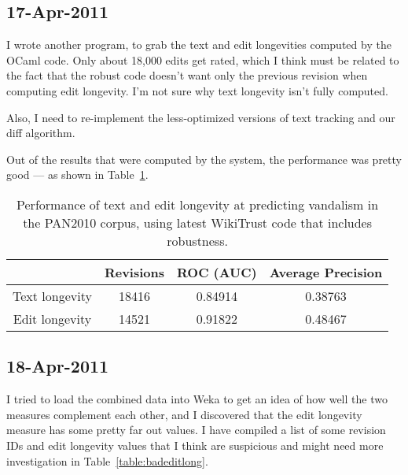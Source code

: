 \subsection{17-Apr-2011}

I wrote another program, 
to grab the text and edit longevities computed by the OCaml code.
Only about 18,000 edits get rated, which I think must be related
to the fact that the robust code doesn't want only the previous
revision when computing edit longevity.
I'm not sure why text longevity isn't fully computed.

Also, I need to re-implement the less-optimized versions
of text tracking and our diff algorithm.

Out of the results that were computed by the system,
the performance was pretty good --- as shown in
Table~\ref{table:robustlongevities}.

\begin{table}[htbp]
\begin{center}
    \begin{tabular}{|c|c|c|c|}
    \hline
    & Revisions & ROC (AUC) & Average Precision \\
    \hline
    Text longevity & 18416 & 0.84914 & 0.38763 \\
    Edit longevity & 14521 & 0.91822 & 0.48467 \\
    \hline
    \end{tabular}
\end{center}
\caption{Performance of text and edit longevity at predicting
    vandalism in the PAN2010 corpus, using latest WikiTrust code
    that includes robustness.}
\label{table:robustlongevities}
\end{table}

\subsection{18-Apr-2011}

I tried to load the combined data into Weka to get an idea
of how well the two measures complement each other, and
I discovered that the edit longevity measure has some pretty
far out values.
I have compiled a list of some revision IDs and edit longevity
values that I think are suspicious and might need more investigation
in Table~\ref{table:badeditlong}.

